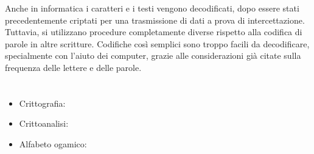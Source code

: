 {{Anche in informatica i caratteri e i testi vengono decodificati, dopo essere stati precedentemente criptati per una trasmissione di dati a prova di intercettazione. Tuttavia, si utilizzano procedure completamente diverse rispetto alla codifica di parole in altre scritture. Codifiche così semplici sono troppo facili da decodificare, specialmente con l’aiuto dei computer, grazie alle considerazioni già citate sulla frequenza delle lettere e delle parole.



\section*{\BrochureWebsitesAndKeywords}
{\raggedright
\begin{itemize}
  \item Crittografia: \href{https://it.wikipedia.org/wiki/Crittografia}{}
  \item Crittoanalisi: \href{https://it.wikipedia.org/wiki/Crittoanalisi}{}
  \item Alfabeto ogamico: \href{https://it.wikipedia.org/wiki/Alfabeto_ogamico}{}
\end{itemize}


}

}{}

\def\AuthorColreavyE{} %
\def\AuthorLehtimakiT{} %
\def\AuthorBarichelloL{} %
\def\AuthorStijfA{} %
\def\AuthorFutschekG{} %
\def\AuthorDatzkoC{} %
\def\AuthorPluharZ{} %
\def\AuthorPohlW{} %
\def\AuthorGiangC{} %

\newpage}{}
